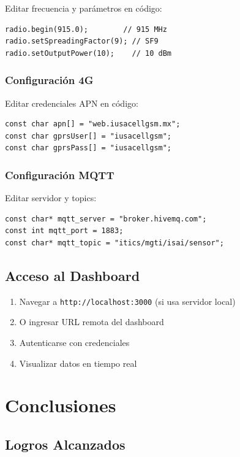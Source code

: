 \documentclass[12pt,a4paper,oneside]{report}
\begin{document}
Editar frecuencia y parámetros en código:

\begin{lstlisting}
radio.begin(915.0);        // 915 MHz
radio.setSpreadingFactor(9); // SF9
radio.setOutputPower(10);    // 10 dBm
\end{lstlisting}

\subsection{Configuración 4G}

Editar credenciales APN en código:

\begin{lstlisting}
const char apn[] = "web.iusacellgsm.mx";
const char gprsUser[] = "iusacellgsm";
const char gprsPass[] = "iusacellgsm";
\end{lstlisting}

\subsection{Configuración MQTT}

Editar servidor y topics:

\begin{lstlisting}
const char* mqtt_server = "broker.hivemq.com";
const int mqtt_port = 1883;
const char* mqtt_topic = "itics/mgti/isai/sensor";
\end{lstlisting}

\section{Acceso al Dashboard}

\begin{enumerate}
    \item Navegar a \texttt{http://localhost:3000} (si usa servidor local)
    \item O ingresar URL remota del dashboard
    \item Autenticarse con credenciales
    \item Visualizar datos en tiempo real
\end{enumerate}

\chapter{Conclusiones}

\section{Logros Alcanzados}
\end{document}
